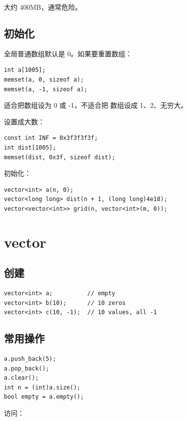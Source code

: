  大约 400MB，通常危险。

\subsection{初始化}

全局普通数组默认是 0。如果要重置数组：

\begin{lstlisting}
int a[1005];
memset(a, 0, sizeof a);
memset(a, -1, sizeof a);
\end{lstlisting}

 适合把数组设为 0 或 -1，不适合把  数组设成 1、2、无穷大。

设置成大数：

\begin{lstlisting}
const int INF = 0x3f3f3f3f;
int dist[1005];
memset(dist, 0x3f, sizeof dist);
\end{lstlisting}

 初始化：

\begin{lstlisting}
vector<int> a(n, 0);
vector<long long> dist(n + 1, (long long)4e18);
vector<vector<int>> grid(n, vector<int>(m, 0));
\end{lstlisting}

\section{vector}\label{sec:04-11}

\subsection{创建}

\begin{lstlisting}
vector<int> a;          // empty
vector<int> b(10);      // 10 zeros
vector<int> c(10, -1);  // 10 values, all -1
\end{lstlisting}

\subsection{常用操作}

\begin{lstlisting}
a.push_back(5);
a.pop_back();
a.clear();
int n = (int)a.size();
bool empty = a.empty();
\end{lstlisting}

访问：

